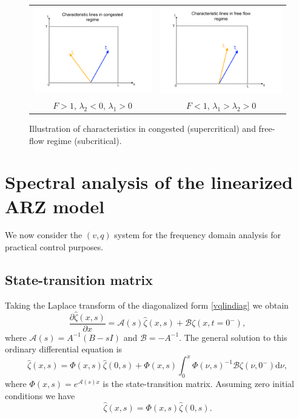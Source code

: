 \documentclass[preprint]{elsarticle}
\begin{document}
\begin{figure}
\begin{centering}
\begin{tabular}{cc}
\includegraphics[width=6cm]{Congested-regime} & \includegraphics[width=6cm]{Free-flow-regime}\tabularnewline
$F>1$, $\lambda_{2}<0$, $\lambda_{1}>0$ & $F<1$, $\lambda_{1}>\lambda_{2}>0$\tabularnewline
\end{tabular}
\par\end{centering}
\protect\caption{Illustration of characteristics in congested (supercritical) and free-flow regime (subcritical).\label{Characteristics}}
\end{figure}


\section{Spectral analysis of the linearized ARZ model}
We now consider the $(v,q)$ system for the frequency domain analysis for practical control purposes.
\subsection{State-transition matrix}
Taking the Laplace transform of the diagonalized form \eqref{vqlindiag} we obtain 
\begin{equation}
\dfrac{\partial \hat{\zeta} (x,s)}{\partial x} = \mathscr{A}(s)\hat{\zeta}(x,s) + \mathscr{B}\zeta(x,t=0^-),
\end{equation}
where $\mathscr{A}(s) = A^{-1}(B - sI)$ and $\mathscr{B} = -A^{-1}$. 
The general solution to this ordinary differential equation is 
\begin{equation}
\hat{\zeta}(x,s) = \Phi(x,s)\hat{\zeta}(0,s) +  \Phi(x,s) \int^x_0 \Phi(\nu,s)^{-1} \mathscr{B} \zeta(\nu,0^-)\text{d} \nu,
\end{equation}
where $\Phi(x,s) = e^{\mathscr{A}(s)x}$ is the state-transition matrix. Assuming zero initial conditions we have 
\begin{equation} \label{TFRiemann}
\hat{\zeta}(x,s) = \Phi(x,s)\hat{\zeta}(0,s).
\end{equation}
\end{document}
